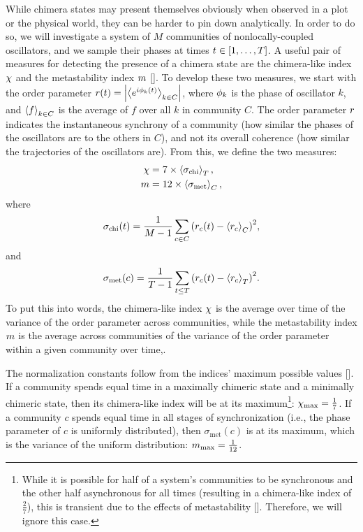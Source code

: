 While chimera states may present themselves obviously when observed in a plot or the physical world, they can be harder to pin down analytically.
In order to do so, we will investigate a system of $M$ communities of nonlocally-coupled oscillators, and we sample their phases at times $t \in \bqty{1, \ldots, T}$.
A useful pair of measures for detecting the presence of a chimera state are the chimera-like index $\chi$ and the metastability index $m$ [].
To develop these two measures, we start with the order parameter $r(t) = \abs{\expval{e^{i \phi_{k}(t)}}_{k \in C}}$, where $\phi_{k}$ is the phase of oscillator $k$, and $\ev{f}_{k \in C}$ is the average of $f$ over all $k$ in community $C$.
The order parameter $r$ indicates the instantaneous synchrony of a community (how similar the phases of the oscillators are to the others in $C$), and not its overall coherence (how similar the trajectories of the oscillators are).
From this, we define the two measures:
\begin{align}
  \label{eq:chimera}
  \chi
  &=
    7 \times \expval{\sigma_{\text{chi}}}_{T}, \\
  \label{eq:metastability}
  m
  &=
    12 \times \expval{\sigma_{\text{met}}}_{C},
\end{align}
where
\begin{equation}
  \sigma_{\text{chi}}(t)
  =
  \frac{1}{M - 1} \sum_{c \in C}\pqty{\ordparam_{c}(t) - \expval{\ordparam_{c}}_{C}}^{2},
\end{equation}
and
\begin{equation}
  \sigma_{\text{met}}(c)
  =
  \frac{1}{T - 1} \sum_{t \leq T}\pqty{\ordparam_{c}(t) - \expval{\ordparam_{c}}_{T}}^{2}.
\end{equation}
To put this into words, the chimera-like index $\chi$ is the average over time of the variance of the order parameter across communities, while the metastability index $m$ is the average across communities of the variance of the order parameter within a given community over time,.

The normalization constants follow from the indices' maximum possible values [].
If a community spends equal time in a maximally chimeric state and a minimally chimeric state, then its chimera-like index will be at its maximum\footnote{While it is possible for half of a system's communities to be synchronous and the other half asynchronous for all times (resulting in a chimera-like index of $\frac{2}{7}$), this is transient due to the effects of metastability [].  Therefore, we will ignore this case.}: $\chi_{\text{max}} = \frac{1}{7}$.
If a community $c$ spends equal time in all stages of synchronization (i.e., the phase parameter of $c$ is uniformly distributed), then $\sigma_{\text{met}}(c)$ is at its maximum, which is the variance of the uniform distribution: $m_{\text{max}} = \frac{1}{12}$.

